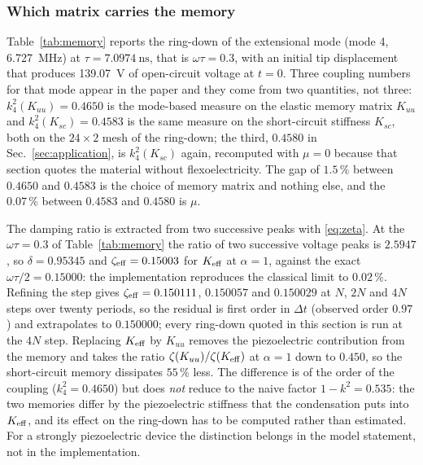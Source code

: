\subsubsection{Which matrix carries the memory}

Table~\ref{tab:memory} reports the ring-down of the extensional mode (mode 4,
\SI{6.727}{MHz}) at $\tau=\SI{7.0974}{\nano\second}$, that is $\omega\tau=0.3$,
with an initial tip displacement that produces \SI{139.07}{\volt} of
open-circuit voltage at $t=0$. Three coupling numbers for that mode appear in
the paper and they come from two quantities, not three:
$k^2_{4}(K_{uu})=0.4650$ is the mode-based measure on the elastic memory matrix
$K_{uu}$ and $k^2_{4}(K_{sc})=0.4583$ is the same measure on the short-circuit
stiffness $K_{sc}$, both on the $24\times2$ mesh of the ring-down; the third,
$0.4580$ in Sec.~\ref{sec:application}, is $k^2_{4}(K_{sc})$ again,
recomputed with $\mu=0$ because that section quotes the material without
flexoelectricity. The gap of $1.5\,\%$ between $0.4650$ and $0.4583$ is the
choice of memory matrix and nothing else, and the $0.07\,\%$ between $0.4583$
and $0.4580$ is $\mu$.

The damping ratio is extracted from two successive peaks with
\eqref{eq:zeta}. At the $\omega\tau=0.3$ of Table~\ref{tab:memory} the ratio of
two successive voltage peaks is $2.5947$, so $\delta=0.95345$ and
$\zeta_{\rm eff}=0.15003$ for $K_{\rm eff}$ at $\alpha=1$, against the exact
$\omega\tau/2=0.15000$: the implementation reproduces the classical limit to
$0.02\,\%$. Refining the step gives $\zeta_{\rm eff}=0.150111$, $0.150057$ and
$0.150029$ at $N$, $2N$ and $4N$ steps over twenty periods, so the residual is
first order in $\Delta t$ (observed order $0.97$) and extrapolates to
$0.150000$; every ring-down quoted in this section is run at the $4N$ step.
Replacing $K_{\rm eff}$ by $K_{uu}$ removes the piezoelectric contribution from
the memory and takes the ratio $\zeta(K_{uu})/\zeta(K_{\rm eff})$ at $\alpha=1$
down to $0.450$, so the short-circuit memory dissipates $55\,\%$ less. The
difference is of the order of the coupling ($k^2_{4}=0.4650$) but does
\emph{not} reduce to the naive factor $1-k^2=0.535$: the two memories differ by
the piezoelectric stiffness that the condensation puts into $K_{\rm eff}$, and
its effect on the ring-down has to be computed rather than estimated. For a
strongly piezoelectric device the distinction belongs in the model statement,
not in the implementation.

